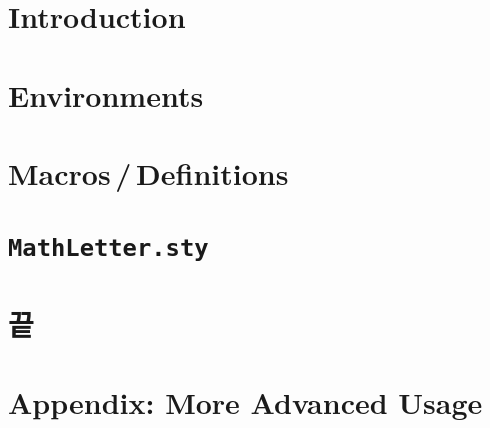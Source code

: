 \documentclass[10pt]{beamer}
\begin{document}
\begin{frame}[plain]
  \maketitle
\end{frame}

\section{Introduction}


\section{Environments}


\section{Macros\,/\,Definitions}


\section{\texttt{MathLetter.sty}}


\section{끝}

\section{Appendix: More Advanced Usage}

\end{document}
